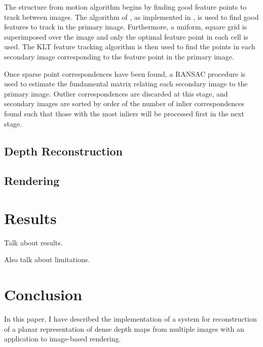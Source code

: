 \documentclass[conference]{acmsiggraph}
\begin{document}
The structure from motion algorithm begins by finding good feature points
to track between images.  The algorithm of \cite{shi1994good}, as implemented
in \cite{opencv_library}, is used to find good features to track in the
primary image.
Furthermore, a uniform, square grid is superimposed over the image and only
the optimal feature point in each cell is used.
The KLT feature tracking algorithm is then used to find the points in each
secondary image corresponding to the feature point in the primary image.

Once sparse point correspondences have been found, a RANSAC procedure
is used to estimate the fundamental matrix relating each secondary
image to the primary image.  Outlier correspondences are discarded at this
stage, and secondary images are sorted by order of the number of inlier
correspondences found such that those with the most inliers will
be processed first in the next stage.

\subsection{Depth Reconstruction}

\subsection{Rendering}



\section{Results}

Talk about results.

Also talk about limitations.

\section{Conclusion}

In this paper, I have described the implementation of a system for
reconstruction of a planar representation of dense depth maps from multiple images
with an application to image-based rendering.



\end{document}
